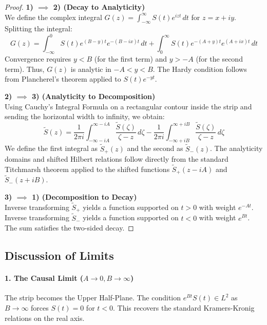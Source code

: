 \documentclass[a4paper,11pt]{article}
\theoremstyle{definition}
\begin{document}
\begin{proof}
\textbf{1) $\implies$ 2) (Decay to Analyticity)} \\
We define the complex integral $G(z) = \int_{-\infty}^{\infty} S(t) e^{i z t} \, dt$ for $z = x + iy$.
Splitting the integral:
\begin{equation}
    G(z) = \int_{-\infty}^{0} S(t) e^{(B-y)t} e^{-(B-i x)t} \, dt + \int_{0}^{\infty} S(t) e^{-(A+y)t} e^{(A+ix)t} \, dt
\end{equation}
Convergence requires $y < B$ (for the first term) and $y > -A$ (for the second term). Thus, $G(z)$ is analytic in $-A < y < B$. The Hardy condition follows from Plancherel's theorem applied to $S(t)e^{-yt}$.

\vspace{0.5cm}
\textbf{2) $\implies$ 3) (Analyticity to Decomposition)} \\
Using Cauchy's Integral Formula on a rectangular contour inside the strip and sending the horizontal width to infinity, we obtain:
\begin{equation}
    \tilde{S}(z) = \frac{1}{2\pi i} \int_{-\infty - iA}^{\infty - iA} \frac{\tilde{S}(\zeta)}{\zeta - z} \, d\zeta - \frac{1}{2\pi i} \int_{-\infty + iB}^{\infty + iB} \frac{\tilde{S}(\zeta)}{\zeta - z} \, d\zeta
\end{equation}
We define the first integral as $\tilde{S}_+(z)$ and the second as $\tilde{S}_-(z)$. The analyticity domains and shifted Hilbert relations follow directly from the standard Titchmarsh theorem applied to the shifted functions $\tilde{S}_+(z-iA)$ and $\tilde{S}_-(z+iB)$.

\vspace{0.5cm}
\textbf{3) $\implies$ 1) (Decomposition to Decay)} \\
Inverse transforming $\tilde{S}_+$ yields a function supported on $t>0$ with weight $e^{-At}$. Inverse transforming $\tilde{S}_-$ yields a function supported on $t<0$ with weight $e^{Bt}$. The sum satisfies the two-sided decay.
\end{proof}

\subsection*{Discussion of Limits}

\paragraph{1. The Causal Limit ($A \to 0, B \to \infty$)}
The strip becomes the Upper Half-Plane. The condition $e^{Bt}S(t) \in L^2$ as $B \to \infty$ forces $S(t) = 0$ for $t<0$. This recovers the standard Kramers-Kronig relations on the real axis.
\end{document}
